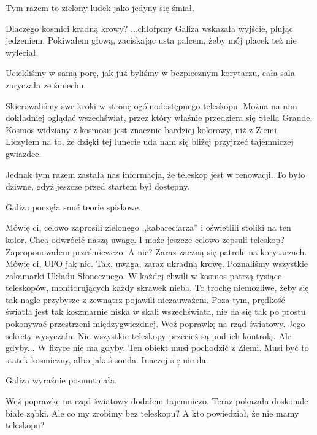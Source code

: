 Tym razem to zielony ludek jako jedyny się śmiał.

\begin{dialogue}
	\ds{} Dlaczego kosmici kradną krowy?
	\ds{} ...chłofpmy \dm{} Galiza wskazała wyjście, plując jedzeniem. Pokiwałem głową, zaciskając usta palcem, żeby mój placek też nie wyleciał.
\end{dialogue}

Uciekliśmy w samą porę, jak już byliśmy w bezpiecznym korytarzu, cała sala zaryczała ze śmiechu.

Skierowaliśmy swe kroki w stronę ogólnodostępnego teleskopu.
Można na nim dokładniej oglądać wszechświat, przez który właśnie przedziera się Stella Grande.
Kosmos widziany z kosmosu jest znacznie bardziej kolorowy, niż z Ziemi.
Liczyłem na to, że dzięki tej lunecie uda nam się bliżej przyjrzeć tajemniczej gwiazdce.

Jednak tym razem zastała nas informacja, że teleskop jest w renowacji.
To było dziwne, gdyż jeszcze przed startem był dostępny.

Galiza poczęła snuć teorie spiskowe.
\begin{dialogue}
	\ds{} Mówię ci, celowo zaprosili zielonego ,,kabareciarza'' i oświetlili stoliki na ten kolor. Chcą odwrócić naszą uwagę.
	\ds{} I może jeszcze celowo zepsuli teleskop? \dm{} Zaproponowałem prześmiewczo.
	\ds{} A nie? Zaraz zaczną się patrole na korytarzach. Mówię ci, UFO jak nic.
	\ds{} Tak, uwaga, zaraz ukradną krowę. Poznaliśmy wszystkie zakamarki Układu Słonecznego. W każdej chwili w kosmos patrzą tysiące teleskopów, monitorujących każdy skrawek nieba. To trochę niemożliwe, żeby się tak nagle przybysze z zewnątrz pojawili niezauważeni. Poza tym, prędkość światła jest tak koszmarnie niska w skali wszechświata, nie da się tak po prostu pokonywać przestrzeni międzygwiezdnej.
	\ds{} Weź poprawkę na rząd światowy. Jego sekrety \dm{} wysyczała.
	\ds{} Nie wszystkie teleskopy przecież są pod ich kontrolą. 
	\ds{} Ale gdyby...
	\ds{} W fizyce nie ma gdyby. Ten obiekt musi pochodzić z Ziemi. Musi być to statek kosmiczny, albo jakaś sonda. Inaczej się nie da.
\end{dialogue}

Galiza wyraźnie posmutniała.

\begin{dialogue}
	\ds{} Weź poprawkę na rząd światowy \dm{} dodałem tajemniczo. Teraz pokazała doskonale białe ząbki.
	\ds{} Ale co my zrobimy bez teleskopu?
	\ds{} A kto powiedział, że nie mamy teleskopu?
\end{dialogue}

